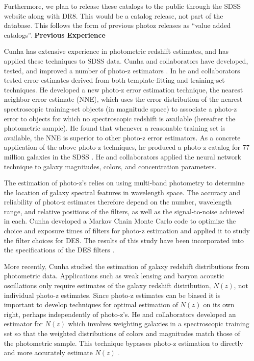\documentclass[11pt]{article}
\begin{document}
\begin{singlespace}
Furthermore, we plan to release these catalogs to the public
through the SDSS website along with DR8. This would be a catalog
release, not part of the database. This follows the form of
previous photoz releases as ``value added catalogs''\citep{dr7vac}.
\newline
\newline
\textbf{Previous Experience}
\newline

Cunha has extensive experience in photometric redshift estimates, and
has applied these techniques to SDSS data. Cunha and collaborators
have developed, tested, and improved a number of photo-z estimators
\citep[e.g.][]{oya06}. In \cite{oya08b} he and collaborators tested
error estimates derived from both template-fitting and training-set
techniques. He developed a new photo-z error estimation technique, the
nearest neighbor error estimate (NNE), which uses the error distribution
of the nearest spectroscopic training-set objects (in magnitude space)
to associate a photo-z error to objects for which no spectroscopic
redshift is available (hereafter the photometric sample). He found that
whenever a reasonable training set is available, the NNE is superior
to other photo-z error estimators. As a concrete application of the
above photo-z techniques, he produced a photo-z catalog for 77 million
galaxies in the SDSS \citep{oya08a}. He and collaborators applied the
neural network technique to galaxy magnitudes, colors, and concentration
parameters.

The estimation of photo-z's relies on using multi-band photometry to
determine the location of galaxy spectral features in wavelength space.
The accuracy and reliability of photo-z estimates therefore depend on
the number, wavelength range, and relative positions of the filters,
as well as the signal-to-noise achieved in each. Cunha developed a
Markov Chain Monte Carlo code to optimize the choice and exposure times
of filters for photo-z estimation and applied it to study the filter
choices for DES. The results of this study have been incorporated into
the specifications of the DES filters \citep{dep08}.

More recently, Cunha studied the estimation of galaxy redshift
distributions from photometric data. Applications such as weak lensing
and baryon acoustic oscillations only require estimates of the galaxy
redshift distribution, $N(z)$, not individual photo-z estimates. Since
photo-z estimates can be biased it is important to develop techniques
for optimal estimation of $N(z)$ on its own right, perhaps independently
of photo-z's. He and collaborators developed an estimator for
$N(z)$ which involves weighting galaxies in a spectroscopic training set
so that the weighted distributions of colors and magnitudes match those
of the photometric sample. This technique bypasses photo-z estimation to
directly and more accurately estimate $N(z)$ \citep{lim08,cun09a}.


\end{singlespace}
\end{document}
